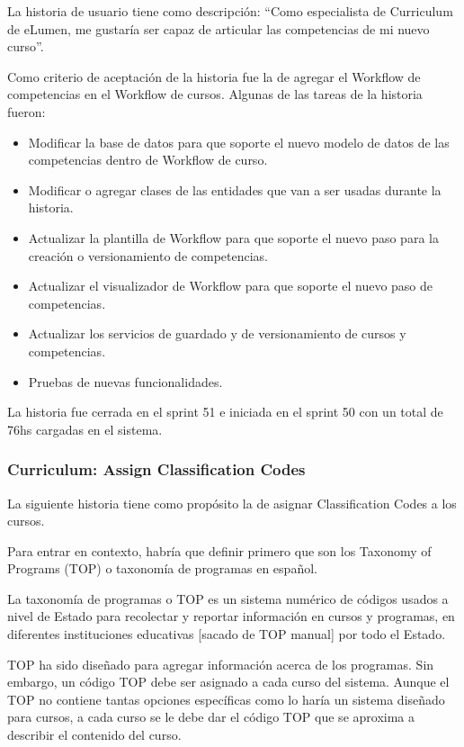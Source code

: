 La historia de usuario tiene como descripción: “Como especialista de Curriculum de eLumen, me gustaría ser capaz de articular las competencias de mi nuevo curso”.

Como criterio de aceptación de la historia fue la de agregar el Workflow de competencias en el Workflow de cursos. Algunas de las tareas de la historia fueron:
\begin{itemize}
	\item Modificar la base de datos para que soporte el nuevo modelo de datos de las competencias dentro de Workflow de curso.
	\item Modificar o agregar clases de las entidades que van a ser usadas durante la historia.
	\item Actualizar la plantilla de Workflow para que soporte el nuevo paso para la creación o versionamiento de competencias.
	\item Actualizar el visualizador de Workflow para que soporte el nuevo paso de competencias.
	\item Actualizar los servicios de guardado y de versionamiento de cursos y competencias.
	\item Pruebas de nuevas funcionalidades.
\end{itemize}

La historia fue cerrada en el sprint 51 e iniciada en el sprint 50 con un total de 76hs cargadas en el sistema.

\subsubsection{Curriculum: Assign Classification Codes}
La siguiente historia tiene como propósito la de asignar Classification Codes a los cursos.

Para entrar en contexto, habría que definir primero que son los Taxonomy of Programs (TOP) o taxonomía de programas en español.

La taxonomía de programas o TOP es un sistema numérico de códigos usados a nivel de Estado para recolectar y reportar información en cursos y programas, en diferentes instituciones educativas [sacado de TOP manual] por todo el Estado. 

TOP ha sido diseñado para agregar información acerca de los programas. Sin embargo, un código TOP debe ser asignado a cada curso del sistema. Aunque el TOP no contiene tantas opciones específicas como lo haría un sistema diseñado para cursos, a cada curso se le debe dar el código TOP que se aproxima a describir el contenido del curso.

